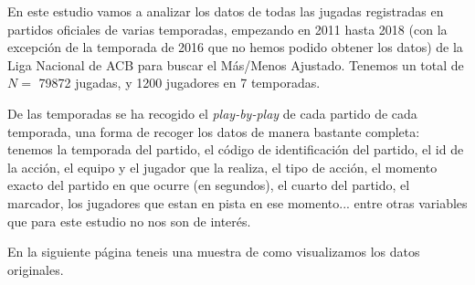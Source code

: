 \documentclass[paper=a4, fontsize=9pt]{article}
\begin{document}
En este estudio vamos a analizar los datos de todas las jugadas registradas en partidos oficiales de varias temporadas, empezando en 2011 hasta 2018 (con la excepción de la temporada de 2016 que no hemos podido obtener los datos) de la Liga Nacional de ACB para buscar el Más/Menos Ajustado. Tenemos un total de $N=$ 79872 jugadas, y 1200 jugadores en 7 temporadas.

De las temporadas se ha recogido el \emph{play-by-play} de cada partido de cada temporada, una forma de recoger los datos de manera bastante completa: tenemos la temporada del partido, el código de identificación del partido, el id de la acción, el equipo y el jugador que la realiza, el tipo de acción, el momento exacto del partido en que ocurre (en segundos), el cuarto del partido, el marcador, los jugadores que estan en pista en ese momento... entre otras variables que para este estudio no nos son de interés.

En la siguiente página teneis una muestra de como visualizamos los datos originales. 
\end{document}
